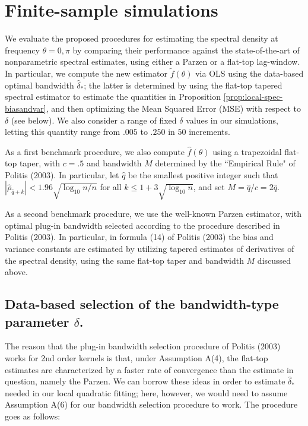 \documentclass[12p E.Lt,psfig]{article} %
\begin{document}
\section{Finite-sample simulations}
\label{sec.sims}

 We evaluate the proposed procedures for estimating the spectral density at frequency $\theta = 0, \pi$
  by comparing their performance against the state-of-the-art of nonparametric spectral estimates,
using either    a Parzen or a     flat-top lag-window.   In particular,
   we compute the new estimator $\widetilde{f} (\theta)$  via OLS
using  the data-based optimal bandwidth $\widehat{\delta}_*$; the latter
  is determined by using the flat-top tapered spectral estimator to estimate the quantities in
  Proposition \ref{prop:local-spec-biasandvar}, and then optimizing the
  Mean Squared Error (MSE) with respect to $\delta$ (see below).
  We also consider a range of fixed $\delta$ values in our simulations, letting this quantity range from
   $.005$ to $.250$ in $50$ increments.

   As a first  benchmark procedure, we also compute $\widehat{f} (\theta)$
  using a trapezoidal flat-top taper, with $c = .5$ and bandwidth $M$  determined by the
   ``Empirical Rule" of Politis (2003).  In particular, let $\widehat{q}$ be the smallest
   positive integer such that $| \widehat{\rho}_{\hat{q}+k} | <  1.96  \sqrt{\log_{10} n/n}$
   for all  $k \leq 1 + 3 \sqrt{\log_{10} n}$, and set $M = \widehat{q} / c = 2 \widehat{q}$.

  As a second benchmark procedure, we use the well-known Parzen estimator, with optimal 
   plug-in   bandwidth selected according to the procedure    described in Politis (2003).
    In particular, in formula (14) of Politis (2003) the bias and variance
constants are estimated by utilizing
    tapered estimates of  derivatives of the spectral density, using the same flat-top taper
    and bandwidth $M$ discussed %
above.

\subsection{Data-based selection of the bandwidth-type parameter $\delta$.}
The reason that the plug-in bandwidth selection procedure of Politis (2003) works
for 2nd order kernels is that,  under Assumption A(4),  the 
flat-top estimates are characterized by a faster rate of convergence than the
estimate in question, namely the Parzen. We can borrow these ideas in order to
estimate $\widehat{\delta}_*$ needed in our local quadratic fitting;
here, however, we would need to assume Assumption A(6) for 
our bandwidth selection procedure to work.
The  procedure goes as follows:
\end{document}
